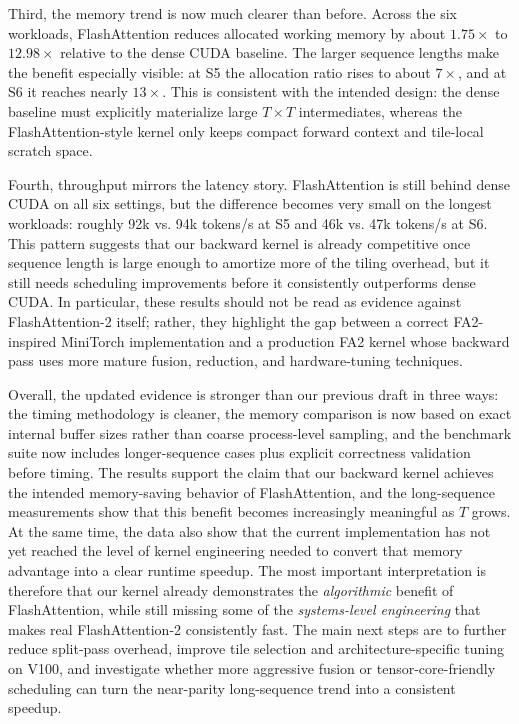 \documentclass{article}
\begin{document}
Third, the memory trend is now much clearer than before. Across the six workloads, FlashAttention reduces allocated working memory by about $1.75\times$ to $12.98\times$ relative to the dense CUDA baseline. The larger sequence lengths make the benefit especially visible: at S5 the allocation ratio rises to about $7\times$, and at S6 it reaches nearly $13\times$. This is consistent with the intended design: the dense baseline must explicitly materialize large $T \times T$ intermediates, whereas the FlashAttention-style kernel only keeps compact forward context and tile-local scratch space.

Fourth, throughput mirrors the latency story. FlashAttention is still behind dense CUDA on all six settings, but the difference becomes very small on the longest workloads: roughly 92k vs. 94k tokens/s at S5 and 46k vs. 47k tokens/s at S6. This pattern suggests that our backward kernel is already competitive once sequence length is large enough to amortize more of the tiling overhead, but it still needs scheduling improvements before it consistently outperforms dense CUDA. In particular, these results should not be read as evidence against FlashAttention-2 itself; rather, they highlight the gap between a correct FA2-inspired MiniTorch implementation and a production FA2 kernel whose backward pass uses more mature fusion, reduction, and hardware-tuning techniques.

Overall, the updated evidence is stronger than our previous draft in three ways: the timing methodology is cleaner, the memory comparison is now based on exact internal buffer sizes rather than coarse process-level sampling, and the benchmark suite now includes longer-sequence cases plus explicit correctness validation before timing. The results support the claim that our backward kernel achieves the intended memory-saving behavior of FlashAttention, and the long-sequence measurements show that this benefit becomes increasingly meaningful as $T$ grows. At the same time, the data also show that the current implementation has not yet reached the level of kernel engineering needed to convert that memory advantage into a clear runtime speedup. The most important interpretation is therefore that our kernel already demonstrates the \emph{algorithmic} benefit of FlashAttention, while still missing some of the \emph{systems-level engineering} that makes real FlashAttention-2 consistently fast. The main next steps are to further reduce split-pass overhead, improve tile selection and architecture-specific tuning on V100, and investigate whether more aggressive fusion or tensor-core-friendly scheduling can turn the near-parity long-sequence trend into a consistent speedup.
\end{document}

